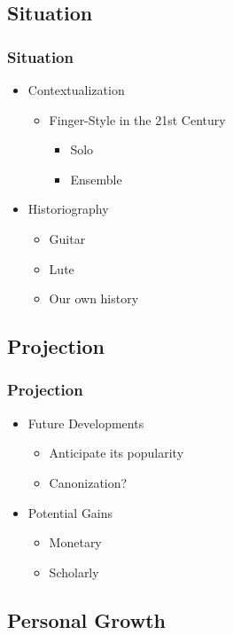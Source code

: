 \documentclass[xetex,mathserif,14pt]{beamer}
\begin{document}
\subsection{Situation}
\begin{frame}
  \frametitle{Situation}
  \begin{itemize}
  \item<1-> Contextualization
    \begin{itemize}
    \item<1-> Finger-Style in the 21st Century
      \begin{itemize}
      \item<1-> Solo
      \item<1-> Ensemble
      \end{itemize}
    \end{itemize}
  \item<2-> Historiography
    \begin{itemize}
    \item<2-> Guitar
    \item<2-> Lute
    \item<2-> Our own history
    \end{itemize}
  \end{itemize}
\end{frame}

\subsection{Projection}

\begin{frame}
  \frametitle{Projection}
  \begin{itemize}
  \item<1-> Future Developments
    \begin{itemize}
    \item<2-> Anticipate its popularity
    \item<2-> Canonization?
    \end{itemize}
  \item<1-> Potential Gains
    \begin{itemize}
    \item<3-> Monetary
    \item<3-> Scholarly
    \end{itemize}
  \end{itemize}
\end{frame}

\subsection{Personal Growth}
\end{document}
